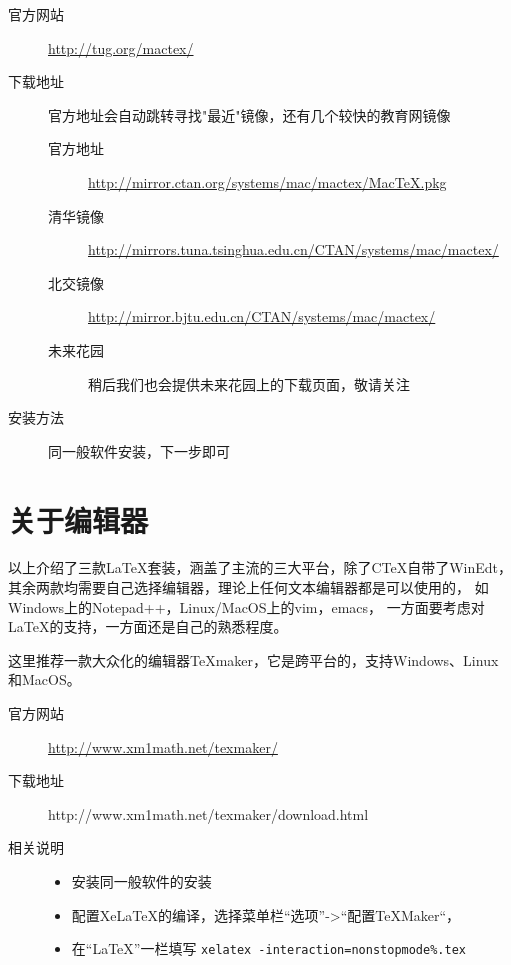 \begin{description}
    \item[官方网站]
        \url{http://tug.org/mactex/}
    \item[下载地址] 官方地址会自动跳转寻找"最近"镜像，还有几个较快的教育网镜像
    \begin{description}
        \item[官方地址]
            \url{http://mirror.ctan.org/systems/mac/mactex/MacTeX.pkg}
        \item[清华镜像]
            \url{http://mirrors.tuna.tsinghua.edu.cn/CTAN/systems/mac/mactex/}
        \item[北交镜像]
            \url{http://mirror.bjtu.edu.cn/CTAN/systems/mac/mactex/}
        \item[未来花园]
            稍后我们也会提供未来花园上的下载页面，敬请关注
    \end{description}
    \item[安装方法] 同一般软件安装，下一步即可
\end{description}

\section{关于编辑器}

以上介绍了三款\LaTeX{}套装，涵盖了主流的三大平台，除了C\TeX{}自带了WinEdt，
其余两款均需要自己选择编辑器，理论上任何文本编辑器都是可以使用的，
如Windows上的Notepad++，Linux/MacOS上的vim，emacs，
一方面要考虑对\LaTeX{}的支持，一方面还是自己的熟悉程度。

这里推荐一款大众化的编辑器\TeX{}maker，它是跨平台的，支持Windows、Linux和MacOS。

\begin{description}
    \item[官方网站]
        \url{http://www.xm1math.net/texmaker/}
    \item[下载地址]
        http://www.xm1math.net/texmaker/download.html
    \item[相关说明]
    \begin{itemize}
        \item 安装同一般软件的安装
        \item 配置Xe\LaTeX{}的编译，选择菜单栏“选项”->“配置\TeX{}Maker“，
        \item[] 在“\LaTeX{}”一栏填写
            \texttt{xelatex -interaction=nonstopmode\%.tex}
    \end{itemize}
\end{description}

